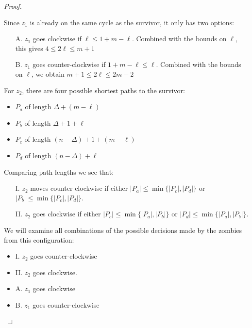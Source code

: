 \documentclass[letterpaper, 10pt]{article}
\begin{document}
\begin{proof}
\begin{proofpart}
  Since $z_1$ is already on the same cycle as the survivor, it only has two options:

  \begin{itemize}
   \item[A.] $z_1$ goes clockwise if $\ell \leq 1 + m - \ell$.
         Combined with the bounds on $\ell$, this gives $4 \leq 2 \ell \leq m + 1$

   \item[B.] $z_1$ goes counter-clockwise if $1 + m - \ell \leq \ell$.
         Combined with the bounds on $\ell$, we obtain $m + 1 \leq 2 \ell \leq 2m - 2$
  \end{itemize}

  For $z_2$, there are four possible shortest paths to the survivor:

  \begin{itemize}
   \item $P_a$ of length $\Delta + (m - \ell)$
   \item $P_b$ of length $\Delta + 1 + \ell$
   \item $P_c$ of length $(n-\Delta) + 1 + (m-\ell)$
   \item $P_d$ of length $(n-\Delta) + \ell$
  \end{itemize}

  Comparing path lengths we see that:

  \begin{itemize}
   \item[I.] $z_2$ moves counter-clockwise if either $|P_a| \leq \min \{ |P_c|, |P_d| \}$ or $|P_b| \leq \min \{ |P_c|, |P_d| \}$.

   \item[II.] $z_2$ goes clockwise if either $|P_c| \leq \min \{ |P_a|, |P_b| \}$ or $|P_d| \leq \min \{ |P_a|, |P_b| \}$.
  \end{itemize}

  We will examine all combinations of the possible decisions
  made by the zombies from this configuration:

  \begin{itemize}
   \item I. $z_2$ goes counter-clockwise
   \item II. $z_2$ goes clockwise.
   \item A. $z_1$ goes clockwise
   \item B. $z_1$ goes counter-clockwise
  \end{itemize}


\end{proofpart}
\end{proof}
\end{document}
